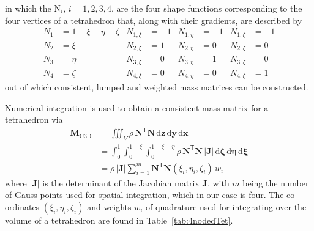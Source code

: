 in which the $\mathrm{N}_i$, $i = 1, 2, 3, 4$, are the four shape functions corresponding to the four vertices of a tetrahedron that, along with their gradients, are described by
\begin{subequations}
    \label{tetShapeFunctions}
	\begin{align}
	N_1 & = 1 - \xi - \eta - \zeta & N_{1,\xi} & = -1 &
    N_{1,\eta} & = -1 & N_{1,\zeta} & = -1 \\
	N_2 & = \xi & N_{2,\xi} & = 1 & N_{2,\eta} & = 0 & N_{2,\zeta} & = 0 \\
	N_3 & = \eta & N_{3,\xi} & = 0 & N_{3,\eta} & = 1 & N_{3,\zeta} & = 0 \\
	N_4 & = \zeta & N_{4,\xi} & = 0 & N_{4,\eta} & = 0 & N_{4,\zeta} & = 1 
	\end{align}
\end{subequations}
out of which consistent, lumped and weighted mass matrices can be constructed.

Numerical integration is used to obtain a consistent mass matrix for a tetrahedron via
\begin{equation}
\begin{aligned}
\mathbf{M}_{\mathrm{C3D}} & = \iiint_V \rho \, \mathbf{N}^{\mathsf{T}} \mathbf{N} \, \mathrm{d} \mathbf{z} \, \mathrm{d} \mathbf{y} \, \mathrm{d} \mathbf{x} \\ & = \int_0^1 \int_0^{1-\xi} \int_0^{1-\xi-\eta} \rho \, \mathbf{N}^{\mathsf{T}} \mathbf{N} \, | \mathbf{J} | \, \mathrm{d} \mathbf{\zeta} \, \mathrm{d} \mathbf{\eta} \, \mathrm{d} \mathbf{\xi} \\ & = \rho \, |\mathbf{J} | \sum_{i=1}^m \mathbf{N}^{\mathsf{T}} \mathbf{N} (\xi_i , \eta_i , \zeta_i ) \, w_i
\end{aligned}
\label{consMass3D}
\end{equation}
where $|\mathbf{J}|$ is the determinant of the Jacobian matrix $\mathbf{J}$, with $m$ being the number of Gauss points used for spatial integration, which in our case is four.  The co-ordinates $( \xi_i , \eta_i , \zeta_i )$ and weights $w_i$ of quadrature used for integrating over the volume of a tetrahedron are found in Table~\ref{tab:4nodedTet}.

